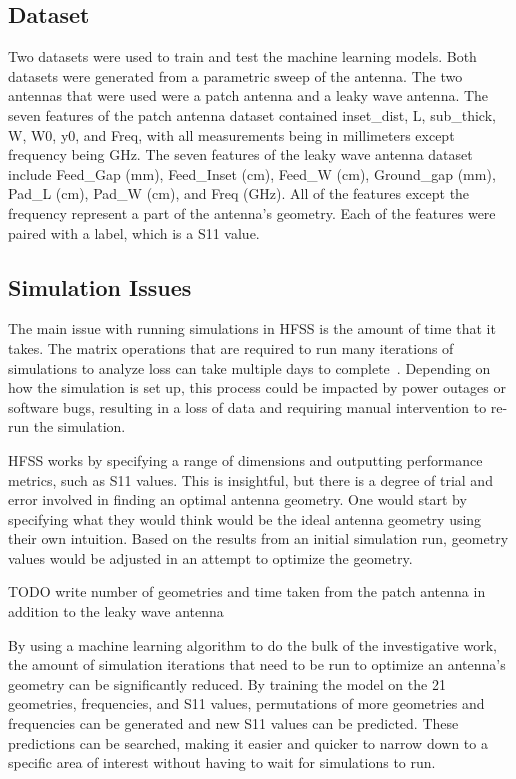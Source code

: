\documentclass[lettersize,journal]{IEEEtran}
\begin{document}
\subsection{Dataset}
Two datasets were used to train and test the machine learning models. Both datasets were generated from a parametric sweep of the antenna. The two antennas that were used were a patch antenna and a leaky wave antenna. The seven features of the patch antenna dataset contained inset\_dist, L, sub\_thick, W, W0, y0, and Freq, with all measurements being in millimeters except frequency being GHz. The seven features of the leaky wave antenna dataset include Feed\_Gap (mm), Feed\_Inset (cm), Feed\_W (cm), Ground\_gap (mm), Pad\_L (cm), Pad\_W (cm), and Freq (GHz). All of the features except the frequency represent a part of the antenna's geometry. Each of the features were paired with a label, which is a S11 value. 


\subsection{Simulation Issues}
The main issue with running simulations in HFSS is the amount of time that it takes. The matrix operations that are required to run many iterations of simulations to analyze loss can take multiple days to complete~\cite{john_antenna_2009}. Depending on how the simulation is set up, this process could be impacted by power outages or software bugs, resulting in a loss of data and requiring manual intervention to re-run the simulation. 

HFSS works by specifying a range of dimensions and outputting performance metrics, such as S11 values. This is insightful, but there is a degree of trial and error involved in finding an optimal antenna geometry. One would start by specifying what they would think would be the ideal antenna geometry using their own intuition. Based on the results from an initial simulation run, geometry values would be adjusted in an attempt to optimize the geometry.

TODO write number of geometries and time taken from the patch antenna in addition to the leaky wave antenna

By using a machine learning algorithm to do the bulk of the investigative work, the amount of simulation iterations that need to be run to optimize an antenna's geometry can be significantly reduced. By training the model on the 21 geometries, frequencies, and S11 values, permutations of more geometries and frequencies can be generated and new S11 values can be predicted. These predictions can be searched, making it easier and quicker to narrow down to a specific area of interest without having to wait for simulations to run.
\end{document}

